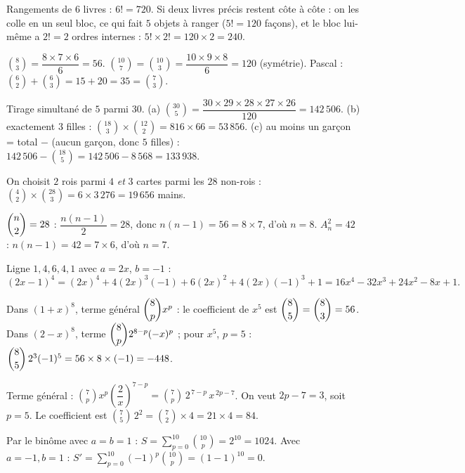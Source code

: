Rangements de $6$ livres : $6!=720$. Si deux livres précis restent côte à côte : on les
\og colle \fg{} en un seul bloc, ce qui fait $5$ objets à ranger ($5!=120$ façons), et le
bloc lui-même a $2!=2$ ordres internes : $5!\times 2!=120\times 2=240$.

$\binom83=\dfrac{8\times 7\times 6}{6}=56$. $\binom{10}{7}=\binom{10}{3}=\dfrac{10\times 9\times 8}{6}=120$ (symétrie). Pascal : $\binom62+\binom63=15+20=35=\binom73$.

Tirage simultané de $5$ parmi $30$.
(a) $\binom{30}{5}=\dfrac{30\times 29\times 28\times 27\times 26}{120}=142\,506$.
(b) exactement $3$ filles : $\binom{18}{3}\times\binom{12}{2}=816\times 66=53\,856$.
(c) au moins un garçon = total $-$ (aucun garçon, donc $5$ filles) : $142\,506-\binom{18}{5}=142\,506-8\,568=133\,938$.

On choisit $2$ rois parmi $4$ \emph{et} $3$ cartes parmi les $28$ non-rois :
$\binom42\times\binom{28}{3}=6\times 3\,276=19\,656$ mains.

$\dbinom n2=28$ : $\dfrac{n(n-1)}{2}=28$, donc $n(n-1)=56=8\times7$, d'où $n=8$.
$A_n^{2}=42$ : $n(n-1)=42=7\times6$, d'où $n=7$.

Ligne $1,4,6,4,1$ avec $a=2x$, $b=-1$ :
\[
(2x-1)^{4}=(2x)^{4}+4(2x)^{3}(-1)+6(2x)^{2}+4(2x)(-1)^{3}+1
=16x^{4}-32x^{3}+24x^{2}-8x+1.
\]

Dans $(1+x)^{8}$, terme général $\dbinom8p x^{p}$ : le coefficient de $x^{5}$ est
$\dbinom85=\dbinom83=56$.
Dans $(2-x)^{8}$, terme $\dbinom8p 2^{8-p}(-x)^{p}$ ; pour $x^{5}$, $p=5$ :
$\dbinom85\,2^{3}(-1)^{5}=56\times 8\times(-1)=-448$.

Terme général : $\binom7p x^{p}\left(\dfrac2x\right)^{7-p}=\binom7p\,2^{\,7-p}\,x^{\,2p-7}$. On veut $2p-7=3$, soit $p=5$. Le coefficient est $\binom75\,2^{2}=\binom72\times 4=21\times 4=84$.

Par le binôme avec $a=b=1$ : $S=\displaystyle\sum_{p=0}^{10}\binom{10}{p}=2^{10}=1024$.
Avec $a=-1,b=1$ : $S'=\displaystyle\sum_{p=0}^{10}(-1)^{p}\binom{10}{p}=(1-1)^{10}=0$.

